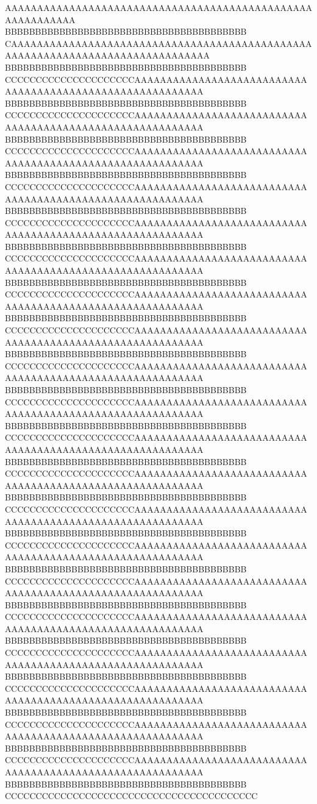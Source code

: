 AAAAAAAAAAAAAAAAAAAAAAAAAAAAAAAAAAAAAAAAAAAAAAAAAAAAAAAAAAA
BBBBBBBBBBBBBBBBBBBBBBBBBBBBBBBBBBBBBBBB
CAAAAAAAAAAAAAAAAAAAAAAAAAAAAAAAAAAAAAAAAAAAAAAAAAAAAAAAAAAAAAAAAAAAAAAAAAAAAAAA
BBBBBBBBBBBBBBBBBBBBBBBBBBBBBBBBBBBBBBBB
CCCCCCCCCCCCCCCCCCCCCAAAAAAAAAAAAAAAAAAAAAAAAAAAAAAAAAAAAAAAAAAAAAAAAAAAAAAAAAA
BBBBBBBBBBBBBBBBBBBBBBBBBBBBBBBBBBBBBBBB
CCCCCCCCCCCCCCCCCCCCCAAAAAAAAAAAAAAAAAAAAAAAAAAAAAAAAAAAAAAAAAAAAAAAAAAAAAAAAAA
BBBBBBBBBBBBBBBBBBBBBBBBBBBBBBBBBBBBBBBB
CCCCCCCCCCCCCCCCCCCCCAAAAAAAAAAAAAAAAAAAAAAAAAAAAAAAAAAAAAAAAAAAAAAAAAAAAAAAAAA
BBBBBBBBBBBBBBBBBBBBBBBBBBBBBBBBBBBBBBBB
CCCCCCCCCCCCCCCCCCCCCAAAAAAAAAAAAAAAAAAAAAAAAAAAAAAAAAAAAAAAAAAAAAAAAAAAAAAAAAA
BBBBBBBBBBBBBBBBBBBBBBBBBBBBBBBBBBBBBBBB
CCCCCCCCCCCCCCCCCCCCCAAAAAAAAAAAAAAAAAAAAAAAAAAAAAAAAAAAAAAAAAAAAAAAAAAAAAAAAAA
BBBBBBBBBBBBBBBBBBBBBBBBBBBBBBBBBBBBBBBB
CCCCCCCCCCCCCCCCCCCCCAAAAAAAAAAAAAAAAAAAAAAAAAAAAAAAAAAAAAAAAAAAAAAAAAAAAAAAAAA
BBBBBBBBBBBBBBBBBBBBBBBBBBBBBBBBBBBBBBBB
CCCCCCCCCCCCCCCCCCCCCAAAAAAAAAAAAAAAAAAAAAAAAAAAAAAAAAAAAAAAAAAAAAAAAAAAAAAAAAA
BBBBBBBBBBBBBBBBBBBBBBBBBBBBBBBBBBBBBBBB
CCCCCCCCCCCCCCCCCCCCCAAAAAAAAAAAAAAAAAAAAAAAAAAAAAAAAAAAAAAAAAAAAAAAAAAAAAAAAAA
BBBBBBBBBBBBBBBBBBBBBBBBBBBBBBBBBBBBBBBB
CCCCCCCCCCCCCCCCCCCCCAAAAAAAAAAAAAAAAAAAAAAAAAAAAAAAAAAAAAAAAAAAAAAAAAAAAAAAAAA
BBBBBBBBBBBBBBBBBBBBBBBBBBBBBBBBBBBBBBBB
CCCCCCCCCCCCCCCCCCCCCAAAAAAAAAAAAAAAAAAAAAAAAAAAAAAAAAAAAAAAAAAAAAAAAAAAAAAAAAA
BBBBBBBBBBBBBBBBBBBBBBBBBBBBBBBBBBBBBBBB
CCCCCCCCCCCCCCCCCCCCCAAAAAAAAAAAAAAAAAAAAAAAAAAAAAAAAAAAAAAAAAAAAAAAAAAAAAAAAAA
BBBBBBBBBBBBBBBBBBBBBBBBBBBBBBBBBBBBBBBB
CCCCCCCCCCCCCCCCCCCCCAAAAAAAAAAAAAAAAAAAAAAAAAAAAAAAAAAAAAAAAAAAAAAAAAAAAAAAAAA
BBBBBBBBBBBBBBBBBBBBBBBBBBBBBBBBBBBBBBBB
CCCCCCCCCCCCCCCCCCCCCAAAAAAAAAAAAAAAAAAAAAAAAAAAAAAAAAAAAAAAAAAAAAAAAAAAAAAAAAA
BBBBBBBBBBBBBBBBBBBBBBBBBBBBBBBBBBBBBBBB
CCCCCCCCCCCCCCCCCCCCCAAAAAAAAAAAAAAAAAAAAAAAAAAAAAAAAAAAAAAAAAAAAAAAAAAAAAAAAAA
BBBBBBBBBBBBBBBBBBBBBBBBBBBBBBBBBBBBBBBB
CCCCCCCCCCCCCCCCCCCCCAAAAAAAAAAAAAAAAAAAAAAAAAAAAAAAAAAAAAAAAAAAAAAAAAAAAAAAAAA
BBBBBBBBBBBBBBBBBBBBBBBBBBBBBBBBBBBBBBBB
CCCCCCCCCCCCCCCCCCCCCAAAAAAAAAAAAAAAAAAAAAAAAAAAAAAAAAAAAAAAAAAAAAAAAAAAAAAAAAA
BBBBBBBBBBBBBBBBBBBBBBBBBBBBBBBBBBBBBBBB
CCCCCCCCCCCCCCCCCCCCCAAAAAAAAAAAAAAAAAAAAAAAAAAAAAAAAAAAAAAAAAAAAAAAAAAAAAAAAAA
BBBBBBBBBBBBBBBBBBBBBBBBBBBBBBBBBBBBBBBB
CCCCCCCCCCCCCCCCCCCCCAAAAAAAAAAAAAAAAAAAAAAAAAAAAAAAAAAAAAAAAAAAAAAAAAAAAAAAAAA
BBBBBBBBBBBBBBBBBBBBBBBBBBBBBBBBBBBBBBBB
CCCCCCCCCCCCCCCCCCCCCAAAAAAAAAAAAAAAAAAAAAAAAAAAAAAAAAAAAAAAAAAAAAAAAAAAAAAAAAA
BBBBBBBBBBBBBBBBBBBBBBBBBBBBBBBBBBBBBBBB
CCCCCCCCCCCCCCCCCCCCCAAAAAAAAAAAAAAAAAAAAAAAAAAAAAAAAAAAAAAAAAAAAAAAAAAAAAAAAAA
BBBBBBBBBBBBBBBBBBBBBBBBBBBBBBBBBBBBBBBB
CCCCCCCCCCCCCCCCCCCCCCCCCCCCCCCCCCCCCCCCC
